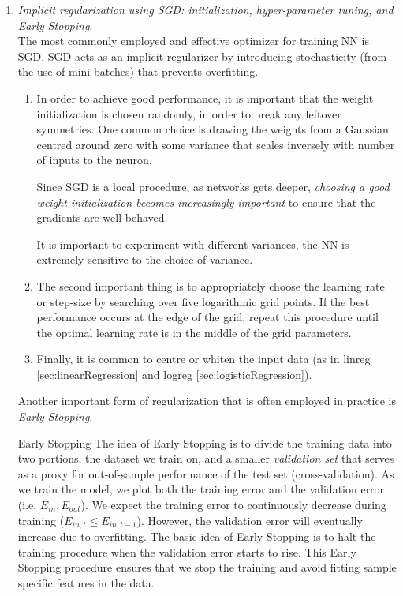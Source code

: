 \begin{enumerate}
	\item \emph{Implicit regularization using SGD: initialization, hyper-parameter tuning, and Early Stopping}.\\
	The most commonly employed and effective optimizer for training NN is SGD. SGD acts as an implicit regularizer by introducing stochasticity (from the use of mini-batches) that prevents overfitting. 
	\begin{enumerate} 
	\item In order to achieve good performance, it is important that the weight initialization is chosen randomly, in order to break any leftover symmetries. One common choice is drawing the weights from a Gaussian centred around zero with some variance that scales inversely with number of inputs to the neuron. 
	\begin{mybox}{}
		Since SGD is a local procedure, as networks gets deeper, \emph{choosing a good weight initialization becomes increasingly important} to ensure that the gradients are well-behaved.
	\end{mybox}
It is important to experiment with different variances, the NN is extremely sensitive to the choice of variance.
	\item The second important thing is to appropriately choose the learning rate or step-size by searching over five logarithmic grid points. If the best performance occurs at the edge of the grid, repeat this procedure until the optimal learning rate is in the middle of the grid parameters.
	\item Finally, it is common to centre or whiten the input data (as in linreg \ref{sec:linearRegression} and logreg \ref{sec:logisticRegression}).
\end{enumerate}
 Another important form of regularization that is often employed in practice is \emph{Early Stopping}.
\begin{mybox}{Early Stopping}
	The idea of Early Stopping is to divide the training data into two portions, the dataset we train on, and a smaller \emph{validation set} that serves as a proxy for out-of-sample performance of the test set (cross-validation). As we train the model, we plot both the training error and the validation error (i.e. $E_{in}, E_{out}$). We expect the training error to continuously decrease during training ($E_{in, t} \leq E_{in,t-1}$). However, the validation error will eventually increase due to overfitting. The basic idea of Early Stopping is to halt the training procedure when the validation error starts to rise. This Early Stopping procedure ensures that we stop the training and avoid fitting sample specific features in the data.

\end{mybox}
\end{enumerate}
